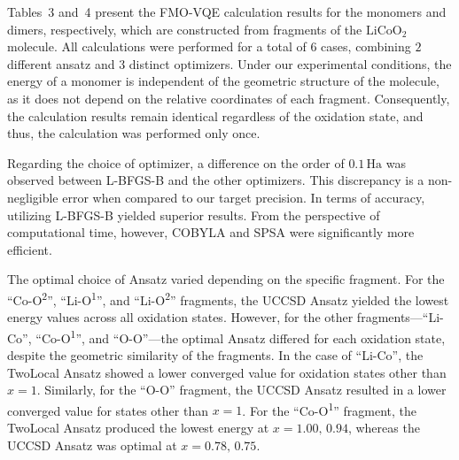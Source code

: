 \documentclass[pdflatex,sn-mathphys-num]{sn-jnl}%
\theoremstyle{thmstyleone}%
\theoremstyle{thmstyletwo}%
\theoremstyle{thmstylethree}%
\begin{document}
Tables~3 and~4 present the FMO-VQE calculation results for the monomers and dimers, respectively, which are constructed from fragments of the \(\mathrm{LiCoO_2}\) molecule. All calculations were performed for a total of $6$ cases, combining $2$ different ansatz and $3$ distinct optimizers. Under our experimental conditions, the energy of a monomer is independent of the geometric structure of the molecule, as it does not depend on the relative coordinates of each fragment. Consequently, the calculation results remain identical regardless of the oxidation state, and thus, the calculation was performed only once.

Regarding the choice of optimizer, a difference on the order of \(0.1\,\mathrm{Ha}\) was observed between L-BFGS-B and the other optimizers. This discrepancy is a non-negligible error when compared to our target precision. In terms of accuracy, utilizing L-BFGS-B yielded superior results. From the perspective of computational time, however, COBYLA and SPSA were significantly more efficient.

The optimal choice of Ansatz varied depending on the specific fragment. For the ``Co-O\textsuperscript{2}'', ``Li-O\textsuperscript{1}'', and ``Li-O\textsuperscript{2}'' fragments, the UCCSD Ansatz yielded the lowest energy values across all oxidation states. However, for the other fragments---``Li-Co'', ``Co-O\textsuperscript{1}'', and ``O-O''---the optimal Ansatz differed for each oxidation state, despite the geometric similarity of the fragments. In the case of ``Li-Co'', the TwoLocal Ansatz showed a lower converged value for oxidation states other than \(x=1\). Similarly, for the ``O-O'' fragment, the UCCSD Ansatz resulted in a lower converged value for states other than \(x=1\). For the ``Co-O\textsuperscript{1}'' fragment, the TwoLocal Ansatz produced the lowest energy at \(x=1.00,\,0.94\), whereas the UCCSD Ansatz was optimal at \(x=0.78,\,0.75\).
\end{document}
